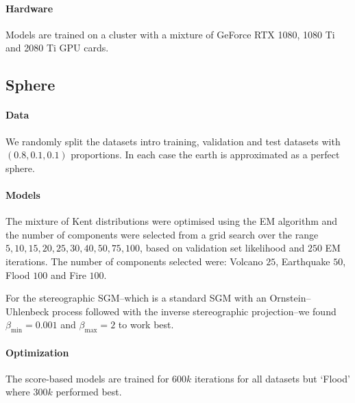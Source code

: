 \paragraph{Hardware}
Models are trained on a cluster with a mixture of GeForce RTX 1080, 1080 Ti and 2080 Ti GPU cards.

\subsection{Sphere}
\paragraph{Data}

We randomly split the datasets intro training, validation and test datasets with \((0.8, 0.1, 0.1)\) proportions.
In each case the earth is approximated as a perfect sphere.

\paragraph{Models}
The mixture of Kent distributions \parencite{peel2001fitting} were optimised using the EM algorithm and the number of components were selected from a grid search over the range \(5, 10, 15, 20, 25, 30, 40, 50, 75, 100\), based on validation set likelihood and \(250\) EM iterations.
The number of components selected were: Volcano \(25\), Earthquake \(50\), Flood \(100\) and Fire \(100\).

For the stereographic SGM--which is a standard SGM with an Ornstein–Uhlenbeck process followed with the inverse stereographic projection--we found \(\beta_{\min}=0.001\) and \(\beta_{\max}=2\) to work best.

\paragraph{Optimization}
The score-based models are trained for \(600k\) iterations for all datasets but `Flood' where \(300k\) performed best.

